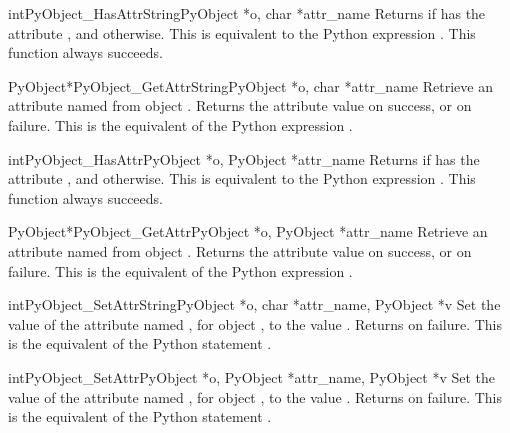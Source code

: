 \documentclass{manual}
\begin{document}
\begin{cfuncdesc}{int}{PyObject_HasAttrString}{PyObject *o, char *attr_name}
Returns  if  has the attribute , and
 otherwise.  This is equivalent to the Python expression
.
This function always succeeds.
\end{cfuncdesc}

\begin{cfuncdesc}{PyObject*}{PyObject_GetAttrString}{PyObject *o,
                                                     char *attr_name}
Retrieve an attribute named  from object .
Returns the attribute value on success, or \NULL{} on failure.
This is the equivalent of the Python expression
.
\end{cfuncdesc}


\begin{cfuncdesc}{int}{PyObject_HasAttr}{PyObject *o, PyObject *attr_name}
Returns  if  has the attribute , and
 otherwise.  This is equivalent to the Python expression
. 
This function always succeeds.
\end{cfuncdesc}


\begin{cfuncdesc}{PyObject*}{PyObject_GetAttr}{PyObject *o,
                                               PyObject *attr_name}
Retrieve an attribute named  from object .
Returns the attribute value on success, or \NULL{} on failure.
This is the equivalent of the Python expression
.
\end{cfuncdesc}


\begin{cfuncdesc}{int}{PyObject_SetAttrString}{PyObject *o, char *attr_name, PyObject *v}
Set the value of the attribute named , for object
, to the value . Returns  on failure.  This is
the equivalent of the Python statement .
\end{cfuncdesc}


\begin{cfuncdesc}{int}{PyObject_SetAttr}{PyObject *o, PyObject *attr_name, PyObject *v}
Set the value of the attribute named , for
object ,
to the value . Returns  on failure.  This is
the equivalent of the Python statement .
\end{cfuncdesc}
\end{document}
